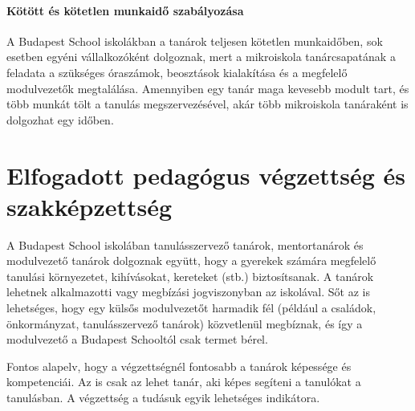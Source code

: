 \paragraph{Kötött és kötetlen munkaidő szabályozása}

A Budapest School  iskolákban a tanárok teljesen kötetlen munkaidőben, sok esetben egyéni vállalkozóként dolgoznak, mert a mikroiskola tanárcsapatának a feladata a szükséges óraszámok, beosztások kialakítása és a megfelelő modulvezetők megtalálása. Amennyiben egy tanár maga kevesebb modult tart, és több munkát tölt a tanulás megszervezésével, akár több mikroiskola tanáraként is dolgozhat egy időben.

\section{Elfogadott pedagógus végzettség és szakképzettség}

A Budapest School iskolában tanulásszervező tanárok, mentortanárok és modulvezető tanárok dolgoznak együtt, hogy a gyerekek számára megfelelő tanulási környezetet, kihívásokat, kereteket (stb.) biztosítsanak. A tanárok lehetnek alkalmazotti vagy megbízási jogviszonyban az iskolával. Sőt az is lehetséges, hogy egy külsős modulvezetőt harmadik fél (például a családok, önkormányzat, tanulásszervező tanárok) közvetlenül megbíznak, és így a modulvezető a Budapest Schooltól csak termet bérel.

Fontos alapelv, hogy a végzettségnél fontosabb a tanárok képessége és kompetenciái. Az is csak az lehet tanár, aki képes segíteni a tanulókat a tanulásban. A végzettség a tudásuk egyik lehetséges indikátora.

